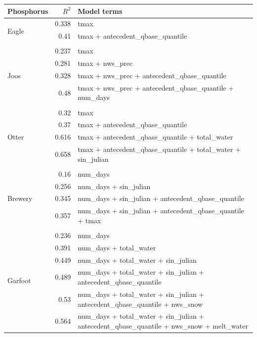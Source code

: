 \documentclass[10pt]{article}
\begin{document}
\begin{table}[h] \small
    \begin{center}
    \begin{tabular}{lrl}
    \textbf{Phosphorus} & $R^2$ & Model terms \\
    \hline
\multirow{3}{*}{Eagle} & 0.338 & tmax\\ 
 & 0.41 & tmax + antecedent\_qbase\_quantile\\ 
\vspace{2mm}\\ \multirow{5}{*}{Joos} & 0.237 & tmax\\ 
 & 0.281 & tmax + nws\_prec\\ 
 & 0.328 & tmax + nws\_prec + antecedent\_qbase\_quantile\\ 
 & 0.48 & tmax + nws\_prec + antecedent\_qbase\_quantile + num\_days\\ 
\vspace{2mm}\\ \multirow{5}{*}{Otter} & 0.32 & tmax\\ 
 & 0.37 & tmax + antecedent\_qbase\_quantile\\ 
 & 0.616 & tmax + antecedent\_qbase\_quantile + total\_water\\ 
 & 0.658 & tmax + antecedent\_qbase\_quantile + total\_water + sin\_julian\\ 
\vspace{2mm}\\ \multirow{5}{*}{Brewery} & 0.16 & num\_days\\ 
 & 0.256 & num\_days + sin\_julian\\ 
 & 0.345 & num\_days + sin\_julian + antecedent\_qbase\_quantile\\ 
 & 0.357 & num\_days + sin\_julian + antecedent\_qbase\_quantile + tmax\\ 
\vspace{2mm}\\ \multirow{7}{*}{Garfoot} & 0.236 & num\_days\\ 
 & 0.391 & num\_days + total\_water\\ 
 & 0.449 & num\_days + total\_water + sin\_julian\\ 
 & 0.489 & num\_days + total\_water + sin\_julian + antecedent\_qbase\_quantile\\ 
 & 0.53 & num\_days + total\_water + sin\_julian + antecedent\_qbase\_quantile + nws\_snow\\ 
 & 0.564 & num\_days + total\_water + sin\_julian + antecedent\_qbase\_quantile + nws\_snow + melt\_water\\ 

\end{tabular}
\end{center}
\end{table}
\end{document}
